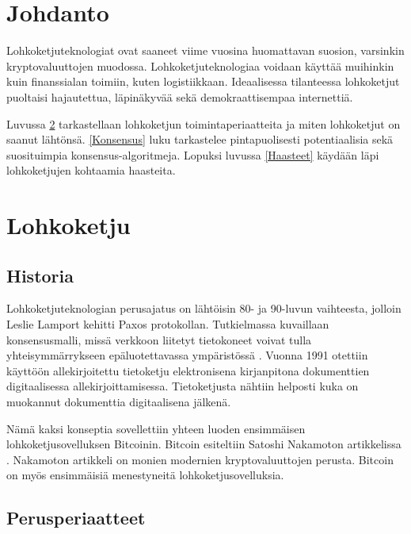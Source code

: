 \documentclass[utf8,bachelor]{gradu3}
\providecommand{\DIFaddbegin}{} %
\providecommand{\DIFaddend}{} %
\newcommand{\DIFaddincludegraphics}[2][]{{\color{blue}\fbox{\DIFOincludegraphics[#1]{#2}}}} %
\DeclareRobustCommand{\DIFaddbegin}{\DIFOaddbegin \let\includegraphics\DIFaddincludegraphics} %
\DeclareRobustCommand{\DIFaddend}{\DIFOaddend \let\includegraphics\DIFOincludegraphics} %
\begin{document}
\mainmatter

\chapter{Johdanto}

Lohkoketjuteknologiat ovat saaneet viime vuosina huomattavan suosion, varsinkin kryptovaluuttojen muodossa. Lohkoketjuteknologiaa voidaan käyttää muihinkin kuin finanssialan toimiin, kuten logistiikkaan. 
Ideaalisessa tilanteessa lohkoketjut puoltaisi hajautettua, läpinäkyvää sekä demokraattisempaa internettiä.

Luvussa \ref{Lohkoketju} tarkastellaan lohkoketjun toimintaperiaatteita ja miten lohkoketjut on saanut lähtönsä.
\ref{Konsensus} luku tarkastelee pintapuolisesti potentiaalisia sekä suosituimpia konsensus-algoritmeja.
Lopuksi luvussa \ref{Haasteet} käydään läpi lohkoketjujen kohtaamia haasteita.



\chapter{Lohkoketju}\label{Lohkoketju}
\section{Historia}

Lohkoketjuteknologian perusajatus on lähtöisin 80- ja 90-luvun vaihteesta, jolloin Leslie Lamport kehitti Paxos protokollan. 
Tutkielmassa kuvaillaan konsensusmalli, missä verkkoon liitetyt tietokoneet voivat tulla yhteisymmärrykseen epäluotettavassa ympäristössä \DIFaddbegin \parencite{lamport2019part}\DIFaddend . 
Vuonna 1991 otettiin käyttöön allekirjoitettu tietoketju elektronisena kirjanpitona dokumenttien digitaalisessa allekirjoittamisessa. Tietoketjusta nähtiin helposti kuka on muokannut dokumenttia digitaalisena jälkenä.

Nämä kaksi konseptia sovellettiin yhteen luoden ensimmäisen lohkoketjusovelluksen Bitcoinin. Bitcoin esiteltiin Satoshi Nakamoton artikkelissa \parencite{nakamoto2008bitcoin}.
Nakamoton artikkeli on monien modernien kryptovaluuttojen perusta.
Bitcoin on myös ensimmäisiä menestyneitä lohkoketjusovelluksia.


\section{Perusperiaatteet}
\end{document}
